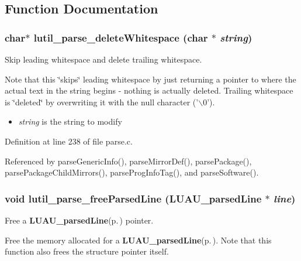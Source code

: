 \subsection{Function Documentation}
\subsubsection{\setlength{\rightskip}{0pt plus 5cm}char$\ast$ lutil\_\-parse\_\-delete\-Whitespace (char $\ast$ {\em string})}\label{parse_8c_a6}


Skip leading whitespace and delete trailing whitespace. 

Note that this \char`\"{}skips\char`\"{} leading whitespace by just returning a pointer to where the actual text in the string begins - nothing is actually deleted. Trailing whitespace is \char`\"{}deleted\char`\"{} by overwriting it with the null character ('$\backslash$0').

\begin{itemize}
\item {\em string\/} is the string to modify 
\end{itemize}


Definition at line 238 of file parse.c.

Referenced by parse\-Generic\-Info(), parse\-Mirror\-Def(), parse\-Package(), parse\-Package\-Child\-Mirrors(), parse\-Prog\-Info\-Tag(), and parse\-Software().
\subsubsection{\setlength{\rightskip}{0pt plus 5cm}void lutil\_\-parse\_\-free\-Parsed\-Line ({\bf LUAU\_\-parsed\-Line} $\ast$ {\em line})}\label{parse_8c_a3}


Free a {\bf LUAU\_\-parsed\-Line}{\rm (p.\,\pageref{structLUAU__parsedLine})} pointer. 

Free the memory allocated for a {\bf LUAU\_\-parsed\-Line}{\rm (p.\,\pageref{structLUAU__parsedLine})}. Note that this function also frees the structure pointer itself.

